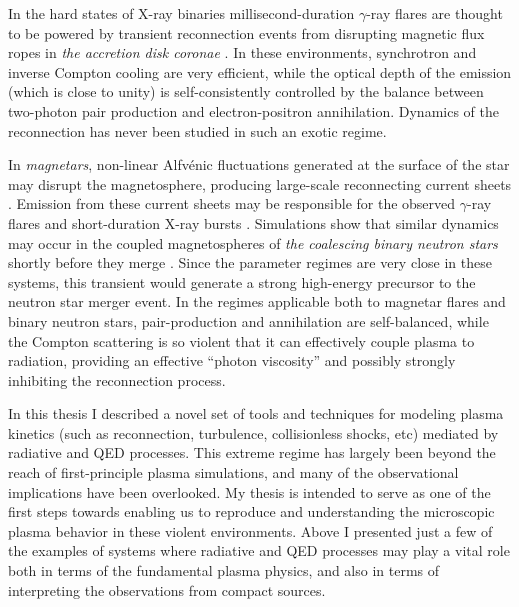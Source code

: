 In the hard states of X-ray binaries millisecond-duration $\gamma$-ray flares \citep[see, e.g.,][]{2003MNRAS.343L..84G} are thought to be powered by transient reconnection events from disrupting magnetic flux ropes in \emph{the accretion disk coronae} \citep{1979ApJ...229..318G,2008ApJ...682..608U,2017ApJ...850..141B}. In these environments, synchrotron and inverse Compton cooling are very efficient, while the optical depth of the emission (which is close to unity) is self-consistently controlled by the balance between two-photon pair production and electron-positron annihilation. Dynamics of the reconnection has never been studied in such an exotic regime.

In \emph{magnetars}, non-linear Alfv\'enic fluctuations generated at the surface of the star may disrupt the magnetosphere, producing large-scale reconnecting current sheets \citep{2020arXiv201107310B,2020ApJ...900L..21Y}. Emission from these current sheets may be responsible for the observed $\gamma$-ray flares and short-duration X-ray bursts \citep{2017ARA&A..55..261K}. Simulations show that similar dynamics may occur in the coupled magnetospheres of \emph{the coalescing binary neutron stars} shortly before they merge \citep{2020ApJ...893L...6M}. Since the parameter regimes are very close in these systems, this transient would generate a strong high-energy precursor to the neutron star merger event. In the regimes applicable both to magnetar flares and binary neutron stars, pair-production and annihilation are self-balanced, while the Compton scattering is so violent that it can effectively couple plasma to radiation, providing an effective ``photon viscosity'' and possibly strongly inhibiting the reconnection process. 

In this thesis I described a novel set of tools and techniques for modeling plasma kinetics (such as reconnection, turbulence, collisionless shocks, etc) mediated by radiative and QED processes. This extreme regime has largely been beyond the reach of first-principle plasma simulations, and many of the observational implications have been overlooked. My thesis is intended to serve as one of the first steps towards enabling us to reproduce and understanding the microscopic plasma behavior in these violent environments. Above I presented just a few of the examples of systems where radiative and QED processes may play a vital role both in terms of the fundamental plasma physics, and also in terms of interpreting the observations from compact sources.
